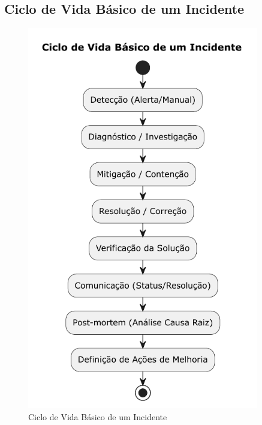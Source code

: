 \subsection{Ciclo de Vida Básico de um Incidente}
\label{subsec:ciclo-incidente}

\begin{figure}[htbp]
    \centering
    \includegraphics[width=0.9\textwidth]{../assets/diagrama-ciclo-incidente.pdf}
    \caption{Ciclo de Vida Básico de um Incidente}
    \label{fig:ciclo-incidente}
\end{figure}

